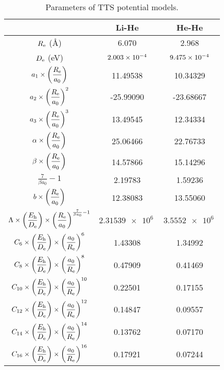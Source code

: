 \documentclass[jcp,amsmath,amssymb,preprint]{revtex4-1}
\begin{document}
\begin{table}
\caption{Parameters of TTS potential models.} 
            \begin{tabular}{c|cc}
            \hline \hline
            ~  & Li-He      & He-He     \\ \hline
            $R_{\rm e}$ (\AA) & 6.070 & 2.968 \\
            $D_{\rm e}$ (eV) & $\SI{2.003E-04}{}$ & $\SI{9.475E-04}{}$\\ \hline
            $\displaystyle a_1 \times \left(\frac{R_{\rm e}}{a_0}\right)$ & 11.49538  & 10.34329  \\
            $\displaystyle a_2 \times \left(\frac{R_{\rm e}}{a_0}\right)^2$ & -25.99090 & -23.68667 \\
            $\displaystyle a_3 \times \left(\frac{R_{\rm e}}{a_0}\right)^3$ & 13.49545  & 12.34334  \\
            $\displaystyle \alpha \times \left(\frac{R_{\rm e}}{a_0}\right)$ & 25.06466  & 22.76733  \\
            $\displaystyle \beta \times \left(\frac{R_{\rm e}}{a_0}\right)$ & 14.57866  & 15.14296  \\
            $\displaystyle \frac{7}{\beta a_0}-1$ & 2.19783   & 1.59236   \\
            $\displaystyle b \times \left(\frac{R_{\rm e}}{a_0}\right)$  & 12.38083  & 13.55060  \\
            $\displaystyle \Lambda \times \left( \frac{E_{\rm h}}{D_{\rm e}} \right) \times \left( \frac{R_{\rm e}}{a_0} \right)^{\frac{7}{\beta a_0}-1}$ & $\SI{2.31539e6}{}$ & $\SI{3.5552e6}{}$  \\
            $\displaystyle C_6 \times \left(\frac{E_{\rm h}}{D_{\rm e}} \right) \times \left(\frac{a_0}{R_{\rm e}} \right)^6 $ & 1.43308   & 1.34992   \\
            $\displaystyle C_8 \times \left(\frac{E_{\rm h}}{D_{\rm e}} \right) \times \left(\frac{a_0}{R_{\rm e}} \right)^8$ & 0.47909   & 0.41469   \\
            $\displaystyle C_{10} \times \left(\frac{E_{\rm h}}{D_{\rm e}} \right) \times \left(\frac{a_0}{R_{\rm e}} \right)^{10}$ & 0.22501   & 0.17155   \\
            $\displaystyle C_{12} \times \left(\frac{E_{\rm h}}{D_{\rm e}} \right) \times \left(\frac{a_0}{R_{\rm e}} \right)^{12}$ & 0.14847   & 0.09557   \\
            $\displaystyle C_{14} \times \left(\frac{E_{\rm h}}{D_{\rm e}} \right) \times \left(\frac{a_0}{R_{\rm e}} \right)^{14}$ & 0.13762   & 0.07170   \\
            $\displaystyle C_{16} \times \left(\frac{E_{\rm h}}{D_{\rm e}} \right) \times \left(\frac{a_0}{R_{\rm e}} \right)^{16}$ & 0.17921   & 0.07244   \\ \hline \hline
            \end{tabular}
            \label{parameters}
\end{table}
\end{document}
